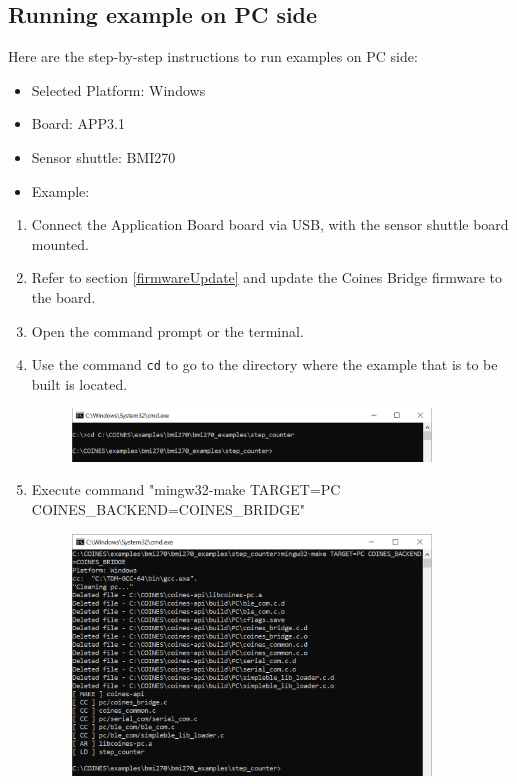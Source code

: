 \documentclass{article}
\begin{document}
\subsection{Running example on PC side}
Here are the step-by-step instructions to run examples on PC side:
\begin{itemize}
	\item Selected Platform: Windows
	\item Board: APP3.1
	\item Sensor shuttle: BMI270
	\item Example: 
\end{itemize}
\begin{enumerate}
	\item Connect the Application Board board via USB, with the sensor shuttle board mounted.
	\item Refer to section \ref{firmwareUpdate} and update the Coines Bridge firmware to the board.
	\item Open the command prompt or the terminal.
	\item Use the command \texttt{cd} to go to the directory where the example that is to be built is located.
	\begin{figure}[H]
		\begin{center}
			\includegraphics[width=0.9\textwidth]{coinesAPI_images/Pc_example_cd.png}
		\end{center}
	\end{figure}
	\item Execute command "mingw32-make TARGET=PC COINES\_BACKEND=COINES\_BRIDGE"
	\begin{figure}[H]
		\begin{center}
			\includegraphics[width=0.9\textwidth]{coinesAPI_images/Pc_example_compile.png}

\end{center}
\end{figure}
\end{enumerate}
\end{document}
